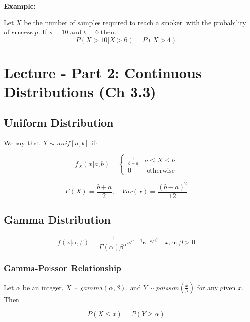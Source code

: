 \documentclass{article}
\begin{document}
\noindent \textbf{Example:}

Let $X$ be the number of samples required to reach a smoker, with the probability of success $p$. If $s = 10$ and $t = 6$ then:
\begin{equation*}
    P(X > 10 | X > 6) = P(X>4)
\end{equation*}

\section{Lecture - Part 2: Continuous Distributions (Ch 3.3)}

\subsection{Uniform Distribution}
We say that $X \sim unif[a,b]$ if:

\begin{equation*}
f_X(x|a,b) = \begin{cases} \frac{1}{b-a} & a \leq X \leq b\\
                        0 & \text{ otherwise}
\end{cases}
\end{equation*}

\begin{equation*}
    E(X) = \frac{b+a}{2}, \quad Var(x) = \frac{(b-a)^2}{12}
\end{equation*}


\subsection{Gamma Distribution}

\begin{equation*}
    f(x|\alpha,\beta) = \frac{1}{\Gamma(\alpha)\beta^\alpha} x^{\alpha-1} e^{-x/\beta} \quad x,\alpha,\beta > 0
\end{equation*}

\subsubsection{Gamma-Poisson Relationship}

Let $\alpha$ be an integer, $X \sim gamma(\alpha,\beta)$, and $Y \sim poisson\left(\frac{x}{\beta}\right)$ for any given $x$. Then

\begin{equation*}
    P(X\leq x ) = P(Y \geq \alpha)
\end{equation*}
\end{document}
